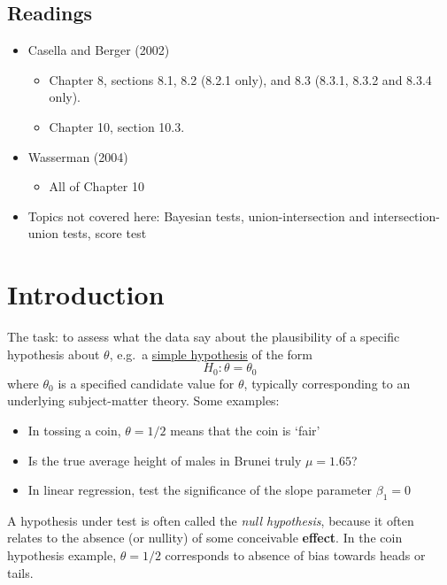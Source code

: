 \documentclass[
]{book}
\providecommand{\tightlist}{%
  \setlength{\itemsep}{0pt}\setlength{\parskip}{0pt}}
\theoremstyle{definition}
\theoremstyle{definition}
\theoremstyle{definition}
\theoremstyle{definition}
\theoremstyle{remark}
\begin{document}
\hypertarget{readings-4}{%
\subsection*{Readings}\label{readings-4}}

\begin{itemize}
\tightlist
\item
  Casella and Berger (2002)

  \begin{itemize}
  \tightlist
  \item
    Chapter 8, sections 8.1, 8.2 (8.2.1 only), and 8.3 (8.3.1, 8.3.2 and 8.3.4 only).
  \item
    Chapter 10, section 10.3.
  \end{itemize}
\item
  Wasserman (2004)

  \begin{itemize}
  \tightlist
  \item
    All of Chapter 10
  \end{itemize}
\item
  Topics not covered here: Bayesian tests, union-intersection and intersection-union tests, score test
\end{itemize}

\hypertarget{introduction-2}{%
\section{Introduction}\label{introduction-2}}

The task: to assess what the data say about the plausibility of a specific hypothesis about \(\theta\), e.g.~a \uline{simple hypothesis} of the form
\[
H_0: \theta = \theta_0
\]
where \(\theta_0\) is a specified candidate value for \(\theta\), typically corresponding to an underlying subject-matter theory.
Some examples:

\begin{itemize}
\tightlist
\item
  In tossing a coin, \(\theta = 1/2\) means that the coin is `fair'
\item
  Is the true average height of males in Brunei truly \(\mu=1.65\)?
\item
  In linear regression, test the significance of the slope parameter \(\beta_1=0\)
\end{itemize}

A hypothesis under test is often called the \emph{null hypothesis}, because it often relates to the absence (or nullity) of some conceivable \textbf{effect}. In the coin hypothesis example, \(\theta=1/2\) corresponds to absence of bias towards heads or tails.
\end{document}
